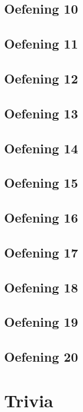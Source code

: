 \documentclass[a4paper,11pt]{report}
\begin{document}
\section{Oefening 10}

\section{Oefening 11}

\section{Oefening 12}

\section{Oefening 13}

\section{Oefening 14}

\section{Oefening 15}

\section{Oefening 16}

\section{Oefening 17}

\section{Oefening 18}

\section{Oefening 19}

\section{Oefening 20}

\newpage

\chapter{Trivia}
\end{document}
